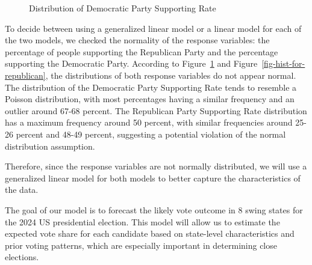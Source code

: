 \documentclass[
  letterpaper,
  DIV=11,
  numbers=noendperiod]{scrartcl}
\begin{document}
\begin{figure}


\caption{\label{fig-hist-for-democratic}Distribution of Democratic Party
Supporting Rate}

\end{figure}%

To decide between using a generalized linear model or a linear model for
each of the two models, we checked the normality of the response
variables: the percentage of people supporting the Republican Party and
the percentage supporting the Democratic Party. According to
Figure~\ref{fig-hist-for-democratic} and
Figure~\ref{fig-hist-for-republican}, the distributions of both response
variables do not appear normal. The distribution of the Democratic Party
Supporting Rate tends to resemble a Poisson distribution, with most
percentages having a similar frequency and an outlier around 67-68
percent. The Republican Party Supporting Rate distribution has a maximum
frequency around 50 percent, with similar frequencies around 25-26
percent and 48-49 percent, suggesting a potential violation of the
normal distribution assumption.

Therefore, since the response variables are not normally distributed, we
will use a generalized linear model for both models to better capture
the characteristics of the data.

The goal of our model is to forecast the likely vote outcome in 8 swing
states for the 2024 US presidential election. This model will allow us
to estimate the expected vote share for each candidate based on
state-level characteristics and prior voting patterns, which are
especially important in determining close elections.
\end{document}
